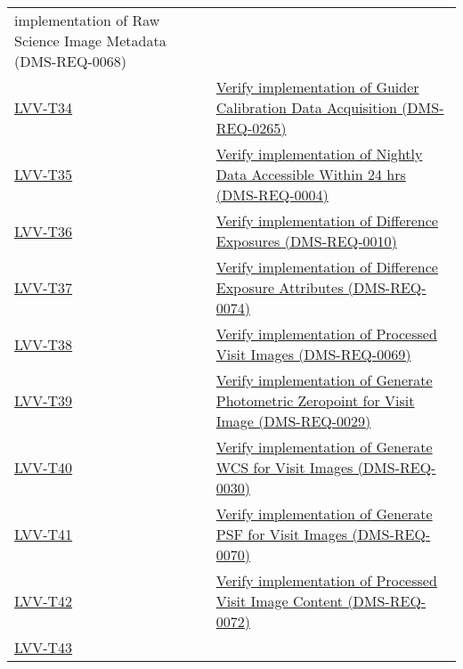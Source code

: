 \begin{longtable}[]{@{}ll@{}}
{implementation of Raw Science Image Metadata
(DMS-REQ-0068)}\tabularnewline
\protect\hyperlink{lvv-t34---verify-implementation-of-guider-calibration-data-acquisition-dms-req-0265}{LVV-T34}
&
\href{https://jira.lsstcorp.org/secure/Tests.jspa\#/testCase/LVV-T34}{Verify
implementation of Guider Calibration Data Acquisition
(DMS-REQ-0265)}\tabularnewline
\protect\hyperlink{lvv-t35---verify-implementation-of-nightly-data-accessible-within-24-hrs-dms-req-0004}{LVV-T35}
&
\href{https://jira.lsstcorp.org/secure/Tests.jspa\#/testCase/LVV-T35}{Verify
implementation of Nightly Data Accessible Within 24 hrs
(DMS-REQ-0004)}\tabularnewline
\protect\hyperlink{lvv-t36---verify-implementation-of-difference-exposures--dms-req-0010}{LVV-T36}
&
\href{https://jira.lsstcorp.org/secure/Tests.jspa\#/testCase/LVV-T36}{Verify
implementation of Difference Exposures (DMS-REQ-0010)}\tabularnewline
\protect\hyperlink{lvv-t37---verify-implementation-of-difference-exposure-attributes-dms-req-0074}{LVV-T37}
&
\href{https://jira.lsstcorp.org/secure/Tests.jspa\#/testCase/LVV-T37}{Verify
implementation of Difference Exposure Attributes
(DMS-REQ-0074)}\tabularnewline
\protect\hyperlink{lvv-t38---verify-implementation-of-processed-visit-images-dms-req-0069}{LVV-T38}
&
\href{https://jira.lsstcorp.org/secure/Tests.jspa\#/testCase/LVV-T38}{Verify
implementation of Processed Visit Images (DMS-REQ-0069)}\tabularnewline
\protect\hyperlink{lvv-t39---verify-implementation-of-generate-photometric-zeropoint-for-visit-image-dms-req-0029}{LVV-T39}
&
\href{https://jira.lsstcorp.org/secure/Tests.jspa\#/testCase/LVV-T39}{Verify
implementation of Generate Photometric Zeropoint for Visit Image
(DMS-REQ-0029)}\tabularnewline
\protect\hyperlink{lvv-t40---verify-implementation-of-generate-wcs-for-visit-images-dms-req-0030}{LVV-T40}
&
\href{https://jira.lsstcorp.org/secure/Tests.jspa\#/testCase/LVV-T40}{Verify
implementation of Generate WCS for Visit Images
(DMS-REQ-0030)}\tabularnewline
\protect\hyperlink{lvv-t41---verify-implementation-of-generate-psf-for-visit-images-dms-req-0070}{LVV-T41}
&
\href{https://jira.lsstcorp.org/secure/Tests.jspa\#/testCase/LVV-T41}{Verify
implementation of Generate PSF for Visit Images
(DMS-REQ-0070)}\tabularnewline
\protect\hyperlink{lvv-t42---verify-implementation-of-processed-visit-image-content-dms-req-0072}{LVV-T42}
&
\href{https://jira.lsstcorp.org/secure/Tests.jspa\#/testCase/LVV-T42}{Verify
implementation of Processed Visit Image Content
(DMS-REQ-0072)}\tabularnewline
\protect\hyperlink{lvv-t43---verify-implementation-of-background-model-calculation-dms-req-0327}{LVV-T43}

\end{longtable}
